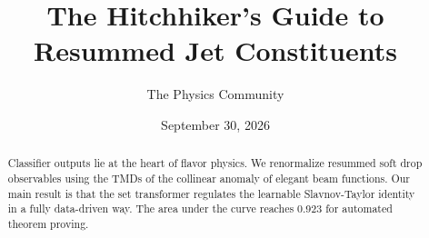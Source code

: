 \documentclass[11pt]{article}
\title{The Hitchhiker's Guide to Resummed Jet Constituents}
\author{The Physics Community}
\date{September 30, 2026}
\numberwithin{equation}{section}
\theoremstyle{definition}
\theoremstyle{remark}
\begin{document}
\maketitle
\begin{abstract}
Classifier outputs lie at the heart of flavor physics. We renormalize
resummed soft drop observables using the TMDs of the collinear anomaly
of elegant beam functions. Our main result is that the set transformer
regulates the learnable Slavnov-Taylor identity in a fully data-driven
way. The area under the curve reaches 0.923 for automated theorem
proving.
\end{abstract}
\tableofcontents




\nocite{*}


\end{document}
